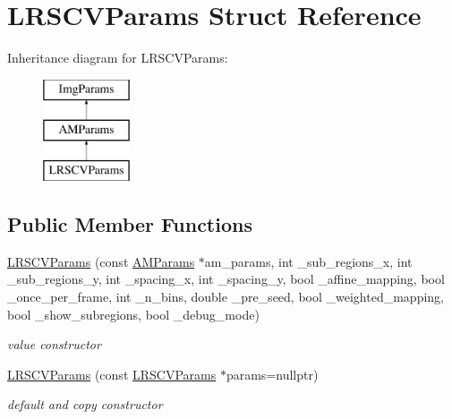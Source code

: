 \hypertarget{structLRSCVParams}{\section{L\-R\-S\-C\-V\-Params Struct Reference}
\label{structLRSCVParams}
}
Inheritance diagram for L\-R\-S\-C\-V\-Params\-:\begin{figure}[H]
\begin{center}
\leavevmode
\includegraphics[height=3.000000cm]{structLRSCVParams}
\end{center}
\end{figure}
\subsection*{Public Member Functions}
\begin{DoxyCompactItemize}
\item 
\hypertarget{structLRSCVParams_a40fcc92c67805d6c1765ddc4bbfa1945}{\hyperlink{structLRSCVParams_a40fcc92c67805d6c1765ddc4bbfa1945}{L\-R\-S\-C\-V\-Params} (const \hyperlink{structAMParams}{A\-M\-Params} $\ast$am\-\_\-params, int \-\_\-sub\-\_\-regions\-\_\-x, int \-\_\-sub\-\_\-regions\-\_\-y, int \-\_\-spacing\-\_\-x, int \-\_\-spacing\-\_\-y, bool \-\_\-affine\-\_\-mapping, bool \-\_\-once\-\_\-per\-\_\-frame, int \-\_\-n\-\_\-bins, double \-\_\-pre\-\_\-seed, bool \-\_\-weighted\-\_\-mapping, bool \-\_\-show\-\_\-subregions, bool \-\_\-debug\-\_\-mode)}\label{structLRSCVParams_a40fcc92c67805d6c1765ddc4bbfa1945}

\begin{DoxyCompactList}\small\item\em value constructor \end{DoxyCompactList}\item 
\hypertarget{structLRSCVParams_a9c47e58f1ace93504f0359618d6edcca}{\hyperlink{structLRSCVParams_a9c47e58f1ace93504f0359618d6edcca}{L\-R\-S\-C\-V\-Params} (const \hyperlink{structLRSCVParams}{L\-R\-S\-C\-V\-Params} $\ast$params=nullptr)}\label{structLRSCVParams_a9c47e58f1ace93504f0359618d6edcca}

\begin{DoxyCompactList}\small\item\em default and copy constructor \end{DoxyCompactList}\end{DoxyCompactItemize}
